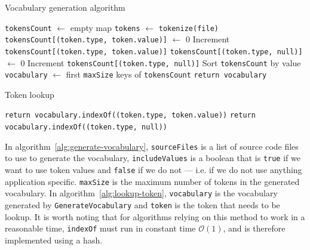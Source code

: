 \begin{algorithm}
  \caption{\label{alg:generate-vocabulary}Vocabulary generation algorithm}
  \begin{algorithmic}[1]
      \State \lstinline{tokensCount} $\gets$ empty map
        \State \lstinline{tokens} $\gets$ \lstinline{tokenize(file)}
            \State \lstinline{tokensCount[(token.type, token.value)]} $\gets$ 0
          \EndIf
          \State Increment \lstinline{tokensCount[(token.type, token.value)]}
              \State \lstinline{tokensCount[(token.type, null)]} $\gets$ 0
            \EndIf
            \State Increment \lstinline{tokensCount[(token.type, null)]}
          \EndIf
        \EndFor
      \EndFor
      \State Sort \lstinline{tokensCount} by value
      \State \lstinline{vocabulary} $\gets$ first \lstinline{maxSize} keys of \lstinline{tokensCount}
      \State \lstinline{return vocabulary}
    \EndFunction%
  \end{algorithmic}
\end{algorithm}

\begin{algorithm}
  \caption{\label{alg:lookup-token}Token lookup}
  \begin{algorithmic}[1]
        \State \lstinline{return vocabulary.indexOf((token.type, token.value))}
      \EndIf
      \State \lstinline{return vocabulary.indexOf((token.type, null))}
    \EndFunction%
  \end{algorithmic}
\end{algorithm}

In algorithm~\ref{alg:generate-vocabulary}, \lstinline{sourceFiles} is a list of
source code files to use to generate the vocabulary, \lstinline{includeValues}
is a boolean that is \lstinline{true} if we want to use token values and
\lstinline{false} if we do not --- i.e. if we do not use anything application
specific. \lstinline{maxSize} is the maximum number of tokens in the generated
vocabulary. In algorithm~\ref{alg:lookup-token}, \lstinline{vocabulary} is the
vocabulary generated by \lstinline{GenerateVocabulary} and \lstinline{token} is
the token that needs to be lookup. It is worth noting that for algorithms
relying on this method to work in a reasonable time, \lstinline{indexOf} must
run in constant time $\mathcal{O}(1)$, and is therefore implemented using a
hash.
